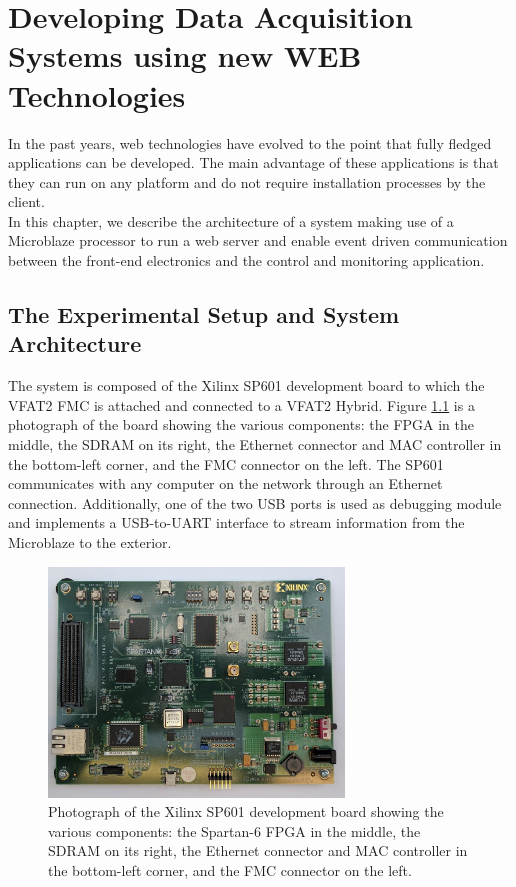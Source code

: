 \chapter{Developing Data Acquisition Systems using new WEB Technologies}
\label{chap:III-2-web-daq}

  In the past years, web technologies have evolved to the point that fully fledged applications can be developed. The main advantage of these applications is that they can run on any platform and do not require installation processes by the client. \\

  In this chapter, we describe the architecture of a system making use of a Microblaze processor to run a web server and enable event driven communication between the front-end electronics and the control and monitoring application.

  \section{The Experimental Setup and System Architecture}

    The system is composed of the Xilinx SP601 development board to which the VFAT2 FMC is attached and connected to a VFAT2 Hybrid. Figure \ref{fig:III-2-sp601} is a photograph of the board showing the various components: the FPGA in the middle, the SDRAM on its right, the Ethernet connector and MAC controller in the bottom-left corner, and the FMC connector on the left. The SP601 communicates with any computer on the network through an Ethernet connection. Additionally, one of the two USB ports is used as debugging module and implements a USB-to-UART interface to stream information from the Microblaze to the exterior. \\

    \begin{figure}[t!]
      \centering
      \includegraphics[width=0.7\textwidth]{img/III-2-web-daq/sp601.jpg}
      \caption{Photograph of the Xilinx SP601 development board showing the various components: the Spartan-6 FPGA in the middle, the SDRAM on its right, the Ethernet connector and MAC controller in the bottom-left corner, and the FMC connector on the left.}
      \label{fig:III-2-sp601}
    \end{figure}

